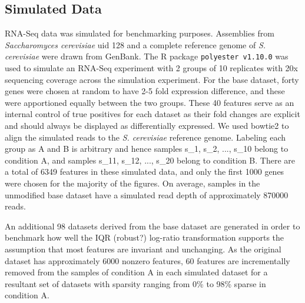 \documentclass [10pt]{article}
\begin{document}
\subsection{Simulated Data}
\vskip-0.25cm
RNA-Seq data was simulated for benchmarking purposes. Assemblies from \textit{Saccharomyces cerevisiae} uid 128 and  a complete reference genome of \textit{S. cerevisiae} were drawn from GenBank. The R package \texttt{polyester v1.10.0} was used to simulate an RNA-Seq experiment with 2 groups of 10 replicates with 20x sequencing coverage across the simulation experiment. For the base dataset, forty genes were chosen at random to have 2-5 fold expression difference, and these were apportioned equally between the two groups. These 40 features serve as an internal control of true positives for each dataset as their fold changes are explicit and should always be displayed as differentially expressed. We used bowtie2 to align the simulated reads  to the \textit{S. cerevisiae} reference genome. Labeling each group as A and B is arbitrary and hence samples s\_1, s\_2, ..., s\_10 belong to condition A, and samples s\_11, s\_12, ..., s\_20 belong to condition B. There are a total of 6349 features in these simulated data, and only the first 1000 genes were chosen for the majority of the figures. On average, samples in the unmodified base dataset have a simulated read depth of approximately 870000 reads. 

An additional 98 datasets derived from the base dataset are generated in order to benchmark how well the IQR (robust?) log-ratio transformation supports the assumption that most features are invariant and unchanging. As the original dataset has approximately 6000 nonzero features, 60 features are incrementally removed from the samples of condition A in each simulated dataset for a resultant set of datasets with sparsity ranging from 0\% to 98\% sparse in condition A. 
\end{document}
